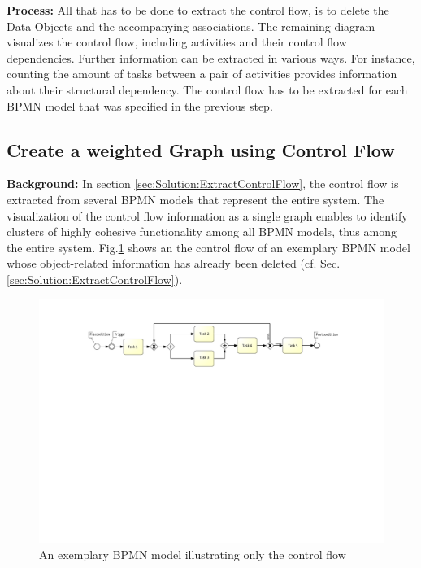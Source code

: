 \noindent
\textbf{Process:} All that has to be done to extract the control flow, is to delete the Data Objects and the accompanying associations. The remaining diagram visualizes the control flow, including activities and their control flow dependencies. Further information can be extracted in various ways. For instance, counting the amount of tasks between a pair of activities provides information about their structural dependency. The control flow has to be extracted for each BPMN model that was specified in the previous step.

\subsection{Create a weighted Graph using Control Flow}
\label{sec:Solution:CreateGraphControl}
\textbf{Background:} In section \ref{sec:Solution:ExtractControlFlow}, the control flow is extracted from several BPMN models that represent the entire system.
The visualization of the control flow information as a single graph enables to identify clusters of highly cohesive functionality among all BPMN models, thus among the entire system. Fig.\ref{fig:controlFlow} shows an the control flow of an exemplary BPMN model whose object-related information has already been deleted (cf. Sec.\ref{sec:Solution:ExtractControlFlow}).

 \begin{figure}[h!]
	\includegraphics[width=\textwidth, trim={4.5cm 14cm 4.0cm 1.5cm}]{img/ControlFlowExample.pdf}
	\caption{An exemplary BPMN model illustrating only the control flow}
	\label{fig:controlFlow}
\end{figure}

